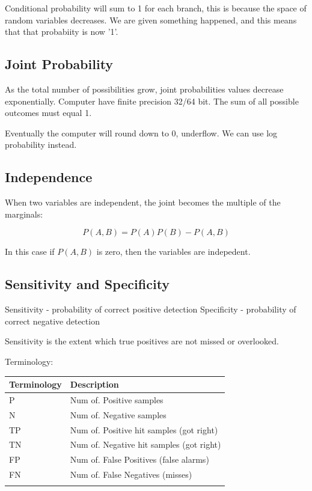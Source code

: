 \documentclass[11pt]{article}
\begin{document}
Conditional probability will sum to 1 for each branch, this is because
the space of random variables decreases. We are given something
happened, and this means that that probabiity is now '1'. 

\subsection{Joint Probability}
\label{sec:org723dfdd}
As the total number of possibilities grow, joint probabilities values
decrease exponentially. Computer have finite precision 32/64 bit. The
sum of all possible outcomes must equal 1. 

Eventually the computer will round down to 0, underflow. We can use
log probability instead. 

\subsection{Independence}
\label{sec:orgb58a3fd}
When two variables are independent, the joint becomes the multiple of
the marginals:

$$ P(A,B) = P(A)P(B)-P(A,B) $$

In this case if \(P(A,B)\) is zero, then the variables are indepedent. 

\subsection{Sensitivity and Specificity}
\label{sec:org228288b}
Sensitivity - probability of correct positive detection
Specificity - probability of correct negative detection

Sensitivity is the extent which true positives are not missed or
overlooked. 


Terminology:
\begin{center}
\begin{tabular}{ll}
Terminology & Description\\
\hline
P & Num of. Positive samples\\
N & Num of. Negative samples\\
TP & Num of. Positive hit samples (got right)\\
TN & Num of. Negative hit samples (got right)\\
FP & Num of. False Positives (false alarms)\\
FN & Num of. False Negatives (misses)\\
 & \\
\end{tabular}
\end{center}
\end{document}
